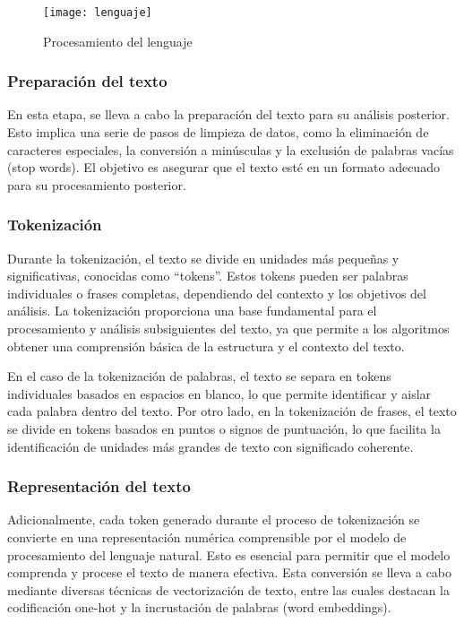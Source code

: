 \begin{figure}[H]
    \centering
    \texttt{[image: lenguaje]}
    \caption{Procesamiento del lenguaje}
    \label{fig:lenguaje}
\end{figure}

\subsubsection{Preparación del texto}
En esta etapa, se lleva a cabo la preparación del texto para su análisis posterior. Esto implica una serie de pasos de limpieza de datos, como la eliminación de caracteres especiales, la conversión a minúsculas y la exclusión de palabras vacías (stop words). El objetivo es asegurar que el texto esté en un formato adecuado para su procesamiento posterior.

\subsubsection{Tokenización}
Durante la tokenización, el texto se divide en unidades más pequeñas y significativas, conocidas como ``tokens''. Estos tokens pueden ser palabras individuales o frases completas, dependiendo del contexto y los objetivos del análisis. La tokenización proporciona una base fundamental para el procesamiento y análisis subsiguientes del texto, ya que permite a los algoritmos obtener una comprensión básica de la estructura y el contexto del texto.

En el caso de la tokenización de palabras, el texto se separa en tokens individuales basados en espacios en blanco, lo que permite identificar y aislar cada palabra dentro del texto. Por otro lado, en la tokenización de frases, el texto se divide en tokens basados en puntos o signos de puntuación, lo que facilita la identificación de unidades más grandes de texto con significado coherente.

\subsubsection{Representación del texto}
Adicionalmente, cada token generado durante el proceso de tokenización se convierte en una representación numérica comprensible por el modelo de procesamiento del lenguaje natural. Esto es esencial para permitir que el modelo comprenda y procese el texto de manera efectiva. Esta conversión se lleva a cabo mediante diversas técnicas de vectorización de texto, entre las cuales destacan la codificación one-hot y la incrustación de palabras (word embeddings).

